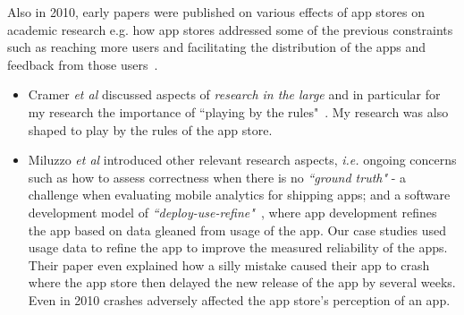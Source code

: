Also in 2010, early papers were published on various effects of app stores on academic research e.g. how app stores addressed some of the previous constraints such as reaching more users and facilitating the distribution of the apps and feedback from those users~\cite{cramer2010_research_in_the_large_app_stores, miluzzo2010research_in_the_app_store_era}. 

\begin{itemize}
    \item Cramer \emph{et al} discussed aspects of \emph{research in the large} and in particular for my research the importance of ``playing by the rules"~\cite{cramer2010_research_in_the_large_app_stores}. My research was also shaped to play by the rules of the app store.

    \item Miluzzo \emph{et al} introduced other relevant research aspects, \textit{i.e.}  ongoing concerns such as how to assess correctness when there is no \emph{``ground truth"} - a challenge when evaluating mobile analytics for shipping apps; and a software development model of \textit{``deploy-use-refine"}~\cite{miluzzo2010research_in_the_app_store_era}, where app development refines the app based on data gleaned from usage of the app. Our case studies used usage data to refine the app to improve the measured reliability of the apps. Their paper even explained how a silly mistake caused their app to crash where the app store then delayed the new release of the app by several weeks. Even in 2010 crashes adversely affected the app store's perception of an app. %
\end{itemize}


